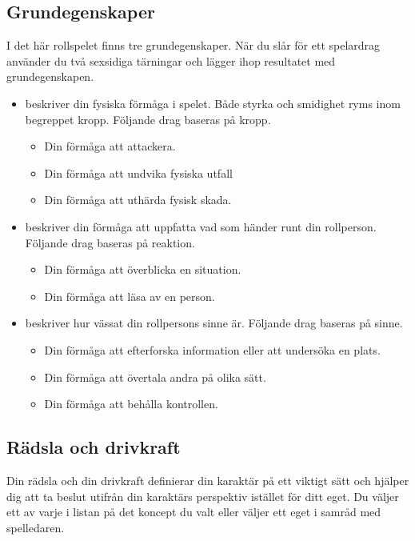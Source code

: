 \subsection{Grundegenskaper}
I det här rollspelet finns tre grundegenskaper. När du slår för ett spelardrag använder du två sexsidiga tärningar och lägger ihop resultatet med grundegenskapen.
\begin{itemize}
  \item {} beskriver din fysiska förmåga i spelet. Både styrka och smidighet ryms inom begreppet kropp. Följande drag baseras på kropp.
  \begin{itemize}
    \item Din förmåga att attackera.
    \item Din förmåga att undvika fysiska utfall
    \item Din förmåga att uthärda fysisk skada.
  \end{itemize}
  \item {} beskriver din förmåga att uppfatta vad som händer runt din rollperson. Följande drag baseras på reaktion.
  \begin{itemize}
    \item Din förmåga att överblicka en situation.
    \item Din förmåga att läsa av en person.
  \end{itemize}
  \item {} beskriver hur vässat din rollpersons sinne är. Följande drag baseras på sinne.
  \begin{itemize}
    \item Din förmåga att efterforska information eller att undersöka en plats.
    \item Din förmåga att övertala andra på olika sätt.
    \item Din förmåga att behålla kontrollen.
  \end{itemize}
\end{itemize}
\subsection{Rädsla och drivkraft}
Din rädsla och din drivkraft definierar din karaktär på ett viktigt sätt och hjälper dig att ta beslut utifrån din karaktärs perspektiv istället för ditt eget.
Du väljer ett av varje i listan på det koncept du valt eller väljer ett eget i samråd med spelledaren.
